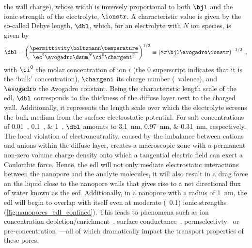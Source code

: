the wall charge), whose width is inversely proportional to both $\bjl$ and the ionic strength of the
electrolyte, $\ionstr$. A characteristic value is given by the so-called Debye length, $\dbl$, which, for an
electrolyte with $N$ ion species, is given by~\cite{Bocquet-2010}
%
\begin{equation}\label{eq:nanopores_debye_length}
  \dbl = \left(
          \dfrac{ \permittivity \boltzmann \temperature }%
                { \ec^2 \avogadro \dsum_i^N \ci^0 \chargeni^2 } \right)^{1/2}
       \equiv \left( 8 \pi \bjl \avogadro \ionstr \right)^{-1/2}
  \text{ ,}
\end{equation}
%
with $\ci^0$ the molar concentration of ion $i$ (the $0$ superscript indicates that it is the `bulk'
concentration), $\chargeni$ its charge number (\ie~valence), and $\avogadro$ the Avogadro constant. Being the
characteristic length scale of the \gls{edl}, $\dbl$ corresponds to the thickness of the diffuse layer next to
the charged wall. Additionally, it represents the length scale over which the electrolyte screens the bulk
medium from the surface electrostatic potential. For salt concentrations of \SIlist{0.01;0.1;1}{\Molar},
$\dbl$ amounts to \SIlist{3.1;0.97;0.31}{\nm}, respectively. The local violation of electroneutrality, caused
by the imbalance between cations and anions within the diffuse layer, creates a macroscopic zone with a
permanent non-zero volume charge density onto which a tangential electric field can exert a Coulombic force.
Hence, the \gls{edl} will not only mediate electrostatic interactions between the nanopore and the analyte
molecules, it will also result in a drag force on the liquid close to the nanopore walls that gives rise to a
net directional flux of water known as the \gls{eof}. Additionally, in a nanopore with a radius of
\SI{1}{\nm}, the \gls{edl} will begin to overlap with itself even at moderate (\eg~\SI{0.1}{\Molar}) ionic
strengths (\cref{fig:nanopores_edl_confined}). This leads to phenomena such as ion concentration
depletion/enrichment~\cite{Plecis-2005}, surface conductance~\cite{Stein-2004},
permselectivty~\cite{Plecis-2005} or pre-concentration~\cite{Pu-2004}---all of which dramatically impact the
transport properties of these pores.

